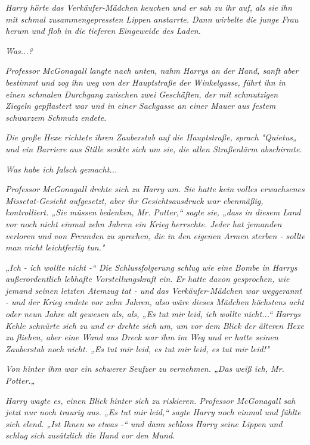 {\emph{Harry hörte das Verkäufer-Mädchen keuchen und er sah zu ihr auf, als sie} \emph{ihn mit schmal zusammengepressten Lippen anstarrte. Dann wirbelte die junge Frau herum und floh in die tieferen Eingeweide des Laden.}

\emph{\emph{Was...?}}

\emph{Professor McGonagall langte nach unten, nahm Harrys an der Hand, sanft aber bestimmt und zog ihn weg von der Hauptstraße der Winkelgasse, führt ihn in einen schmalen Durchgang zwischen zwei Geschäften, der mit schmutzigen Ziegeln gepflastert war und in einer Sackgasse an einer Mauer aus festem schwarzem Schmutz endete.}

\emph{Die große Hexe richtete ihren Zauberstab auf die Hauptstraße, sprach} \emph{\emph{"Quietus„}} \emph{und ein Barriere aus Stille senkte sich um sie, die allen Straßenlärm abschirmte.}

\emph{\emph{Was habe ich falsch gemacht...}}

\emph{Professor McGonagall drehte sich zu Harry um. Sie hatte kein volles erwachsenes} \emph{Missetat-Gesicht} \emph{aufgesetzt, aber ihr Gesichtsausdruck war ebenmäßig, kontrolliert. „Sie müssen bedenken, Mr. Potter,“ sagte sie, „dass in diesem Land vor noch nicht einmal zehn Jahren ein Krieg herrschte. Jeder hat jemanden verloren und von Freunden zu sprechen, die in den eigenen Armen sterben - sollte man nicht leichtfertig tun."}

\emph{„Ich - ich wollte nicht -“ Die Schlussfolgerung schlug wie eine Bombe in Harrys außerordentlich lebhafte Vorstellungskraft ein. Er hatte davon gesprochen, wie jemand seinen letzten Atemzug tat - und das Verkäufer-Mädchen war weggerannt - und der Krieg endete vor zehn Jahren, also wäre dieses Mädchen höchstens acht oder neun Jahre alt gewesen als, als, „Es tut mir leid, ich wollte nicht...“ Harrys Kehle schnürte sich zu und er drehte sich um, um vor dem Blick der älteren Hexe zu fliehen, aber eine Wand aus Dreck war ihm im Weg und er hatte seinen Zauberstab noch nicht. „Es tut mir leid, es tut mir leid, es tut mir} \emph{\emph{leid!}"}

\emph{Von hinter ihm war ein schwerer Seufzer zu vernehmen. „Das weiß ich, Mr. Potter.„}

\emph{Harry wagte es, einen Blick hinter sich zu riskieren. Professor McGonagall sah jetzt nur noch traurig aus. „Es tut mir leid,“ sagte Harry noch einmal und fühlte sich elend. „Ist Ihnen so etwas -“ und dann schloss Harry seine Lippen und schlug sich zusätzlich die Hand vor den Mund.}

}
